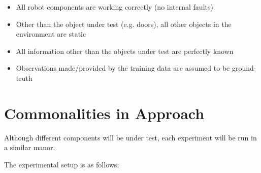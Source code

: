   \begin{itemize}

    \item All robot components are working correctly (no internal faults)

    \item Other than the object under test (e.g. doors), all other objects in the
          environment are static

    \item All information other than the objects under test are perfectly known

    \item Observations made/provided by the training data are assumed to be
          ground-truth

  \end{itemize}


  \section{ Commonalities in Approach }
  Although different components will be under test, each experiment will be run
  in a similar manor.

  The experimental setup is as follows:

